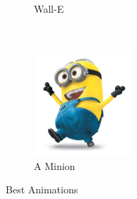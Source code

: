 \documentclass{report}
\begin{document}
\begin{figure}
\begin{subfigure}[b]{0.3\textwidth}
    \caption{Wall-E}
    \label{fig:WallE}
  \end{subfigure}            \\ 
  \begin{subfigure}[b]{0.3\textwidth}
    \includegraphics[width=\textwidth]{minion}
    \caption{A Minion}
    \label{fig:Minnion}
  \end{subfigure}
  \caption{Best Animations}
  \label{fig:animations}
\end{figure}
\end{document}
